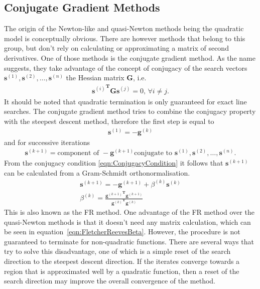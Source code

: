 \subsection{Conjugate Gradient Methods}
\label{sec:ConjugateGradientMethods}

The origin of the Newton-like and quasi-Newton methods being the quadratic
model is conceptually obvious. There are however methods that belong to this
group, but don't rely on calculating or approximating a matrix of second
derivatives. One of those methods is the conjugate gradient method.  As the
name suggests, they take advantage of the concept of conjugacy of the search
vectors $\mathbf{s}^{(1)},\mathbf{s}^{(2)},\dots,\mathbf{s}^{(n)}$ the Hessian
matrix $\mathbf{G}$, i.e.
%
\begin{align}
    {\mathbf{s}^{(i)}}^\mathbf{T}\mathbf{G}\mathbf{s}^{(j)}=0,\,\forall i \neq j.\label{eqn:ConjugacyCondition}
\end{align}
%
It should be noted that quadratic termination is only guaranteed for exact line
searches. The conjugate gradient method tries to combine the conjugacy property
with the steepest descent method, therefore the first step is equal to
%
\begin{align}
    \mathbf{s}^{(1)}=-\mathbf{g}^{(k)}
\end{align}
%
and for successive iterations
%
\begin{align}
    \mathbf{s}^{(k+1)}=\text{component of }-\mathbf{g}^{(k+1)}\text{conjugate to }\mathbf{s}^{(1)},\mathbf{s}^{(2)},\dots,\mathbf{s}^{(n)}.
\end{align}
%
From the conjugacy condition \eqref{eqn:ConjugacyCondition} it follows that
$\mathbf{s}^{(k+1)}$ can be calculated from a Gram-Schmidt orthonormalisation.
%
\begin{align}
    \mathbf{s}^{(k+1)}=-\mathbf{g}^{(k+1)}+\beta^{(k)}\mathbf{s}^{(k)}\\
    \beta^{(k)}=\frac{{\mathbf{g}^{(k+1)}}^\mathbf{T}\mathbf{g}^{(k+1)}}{{\mathbf{g}^{(k)}}^\mathbf{T}\mathbf{g}^{(k)}}\label{eqn:FletcherReevesBeta}
\end{align}
%
This is also known as the \ac{FR}
method.\autocite{Fletcher_Functionminimizationconjugate_1964} One advantage of
the \ac{FR} method over the quasi-Newton methods is that it doesn't need any
matrix calculation, which can be seen in
equation~\eqref{eqn:FletcherReevesBeta}. However, the procedure is not
guaranteed to terminate for non-quadratic functions. There are several ways
that try to solve this disadvantage, one of which is a simple reset of the
search direction to the steepest descent direction. If the iterates converge
towards a region that is approximated well by a quadratic function, then a
reset of the search direction may improve the overall convergence of the
method.

